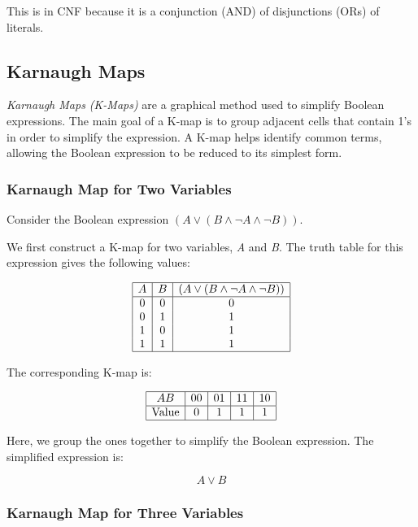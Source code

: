 This is in CNF because it is a conjunction (AND) of disjunctions (ORs) of literals.

\subsection{Karnaugh Maps}

\emph{Karnaugh Maps (K-Maps)} are a graphical method used to simplify Boolean expressions. 
The main goal of a K-map is to group adjacent cells that contain 1's in order to simplify the expression. 
A K-map helps identify common terms, allowing the Boolean expression to be reduced to its simplest form.

\subsubsection{Karnaugh Map for Two Variables}

Consider the Boolean expression \( (A \lor (B \land \neg A \land \neg B)) \).
\vspace{\baselineskip}

We first construct a K-map for two variables, \emph{A} and \emph{B}. The truth table for this expression 
gives the following values:

\[
	\begin{array}{|c|c|c|}
		\hline
		A & B & (A \lor (B \land \neg A \land \neg B)) \\
		\hline
		0 & 0 & 0                                      \\
		0 & 1 & 1                                      \\
		1 & 0 & 1                                      \\
		1 & 1 & 1                                      \\
		\hline
	\end{array}
\]

The corresponding K-map is:

\[
	\begin{array}{|c|c|c|c|c|}
		\hline
		AB           & 00 & 01 & 11 & 10 \\
		\hline
		\text{Value} & 0  & 1  & 1  & 1  \\
		\hline
	\end{array}
\]

Here, we group the ones together to simplify the Boolean expression. The simplified expression is:

\[
	A \lor B
\]

\subsubsection{Karnaugh Map for Three Variables}

